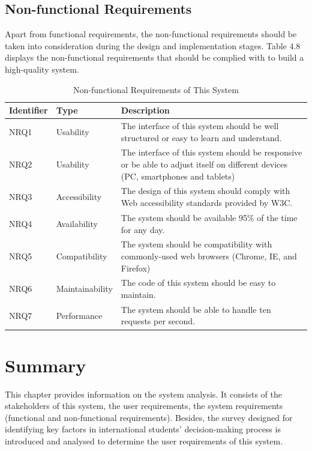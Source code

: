 \subsection{Non-functional Requirements
}

Apart from functional requirements, the non-functional requirements should be taken into consideration during the design and implementation stages. Table 4.8 displays the non-functional requirements that should be complied with to build a high-quality system.

\begin{table}[H]
\centering
\caption{Non-functional Requirements of This System}
\label{my-label}
\begin{tabular}{|p{2cm}|p{3cm}|p{8cm}|}
\hline
\textbf{Identifier} & \textbf{Type}   & \textbf{Description}                                                                                                             \\ \hline
NRQ1                & Usability       & The interface of this system should be well structured or easy to learn and understand.                                          \\ \hline
NRQ2                & Usability       & The interface of this system should be responsive or be able to adjust itself on different devices (PC, smartphones and tablets) \\ \hline
NRQ3                & Accessibility   & The design of this system should comply with Web accessibility standards provided by W3C.                                        \\ \hline
NRQ4                & Availability    & The system should be available  95\% of the time for any day.                                                                    \\ \hline
NRQ5                & Compatibility   & The system should be compatibility with commonly-used web browsers (Chrome, IE,  and Firefox)                                    \\ \hline
NRQ6                & Maintainability & The code of this system should be easy to maintain.                                                                              \\ \hline
NRQ7                & Performance     & The system should be able to handle ten requests per second.                                                                     \\ \hline
\end{tabular}
\end{table}


\section{Summary}
This chapter provides information on the system analysis. It consists of the stakeholders of this system, the user requirements, the system requirements (functional and non-functional requirements). Besides, the survey designed for identifying key factors in international students’ decision-making process is introduced and analysed to determine the user requirements of this system.


